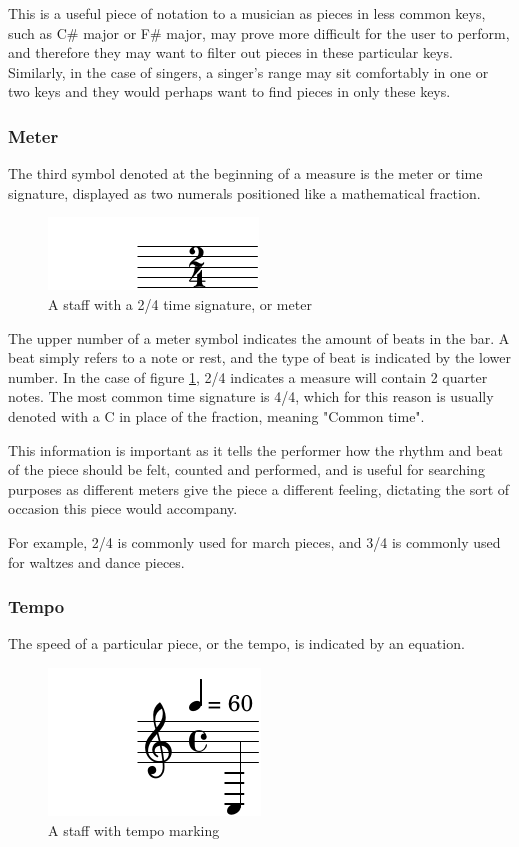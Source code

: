 This is a useful piece of notation to a musician as pieces in less common keys, such as C\# major or F\# major, may prove more difficult for the user to perform, and therefore they may want to filter out pieces in these particular keys. Similarly, in the case of singers, a singer's range may sit comfortably in one or two keys and they would perhaps want to find pieces in only these keys. 

\subsubsection{Meter}
The third symbol denoted at the beginning of a measure is the meter or time signature, displayed as two numerals positioned like a mathematical fraction.

\begin{figure}[h]
    \centering
        \includegraphics{meter-crop.pdf}
    \caption{A staff with a 2/4 time signature, or meter}
    \label{fig:meter}
\end{figure}

The upper number of a meter symbol indicates the amount of beats in the bar. A beat simply refers to a note or rest, and the type of beat is indicated by the lower number. In the case of figure \ref{fig:meter}, 2/4 indicates a measure will contain 2 quarter notes. The most common time signature is 4/4, which for this reason is usually denoted with a C in place of the fraction, meaning "Common time".

This information is important as it tells the performer how the rhythm and beat of the piece should be felt, counted and performed, and is useful for searching purposes as different meters give the piece a different feeling, dictating the sort of occasion this piece would accompany. 

For example, 2/4 is commonly used for march pieces, and 3/4 is commonly used for waltzes and dance pieces.

\subsubsection{Tempo}
The speed of a particular piece, or the tempo, is indicated by an equation.

\begin{figure}[h]
    \centering
        \includegraphics{tempo-crop.pdf}
    \caption{A staff with tempo marking}
    \label{fig:tempo}
\end{figure}

